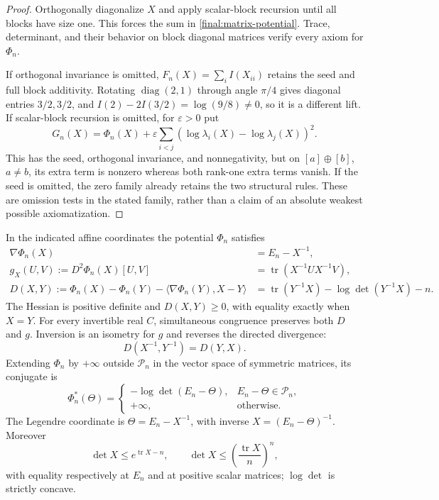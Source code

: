 \begin{proof}
Orthogonally diagonalize $X$ and apply scalar-block recursion until
all blocks have size one.  This forces the sum in
\eqref{final:matrix-potential}.  Trace, determinant, and their behavior
on block diagonal matrices verify every axiom for $\Phi_n$.

If orthogonal invariance is omitted,
$F_n(X)=\sum_i I(X_{ii})$ retains the seed and full block additivity.
Rotating $\operatorname{diag}(2,1)$ through angle $\pi/4$ gives diagonal
entries $3/2,3/2$, and
$I(2)-2I(3/2)=\log(9/8)\ne0$, so it is a different lift.
If scalar-block recursion is omitted, for $\varepsilon>0$ put
\[
 G_n(X)=\Phi_n(X)+\varepsilon
   \sum_{i<j}(\log\lambda_i(X)-\log\lambda_j(X))^2.
\]
This has the seed, orthogonal invariance, and nonnegativity, but on
$[a]\oplus[b]$, $a\ne b$, its extra term is nonzero whereas both
rank-one extra terms vanish.  If the seed is omitted, the zero family
already retains the two structural rules.  These are omission tests
in the stated family, rather than a claim of an absolute weakest
possible axiomatization.
\end{proof}

\begin{theorem}
\label{final:M2}
In the indicated affine coordinates the potential $\Phi_n$ satisfies
\begin{align}
 \nabla\Phi_n(X)&=E_n-X^{-1},\label{final:matrix-gradient}\\
 g_X(U,V):=D^2\Phi_n(X)[U,V]
   &=\operatorname{tr}(X^{-1}UX^{-1}V),\label{final:matrix-hessian}\\
 D(X,Y):=\Phi_n(X)-\Phi_n(Y)
   -\langle\nabla\Phi_n(Y),X-Y\rangle
   &=\operatorname{tr}(Y^{-1}X)-\log\det(Y^{-1}X)-n.
   \label{final:matrix-divergence}
\end{align}
The Hessian is positive definite and $D(X,Y)\geq0$, with equality
exactly when $X=Y$.  For every invertible real $C$, simultaneous
congruence preserves both $D$ and $g$.  Inversion is an isometry for
$g$ and reverses the directed divergence:
\[
 D(X^{-1},Y^{-1})=D(Y,X).
\]
Extending $\Phi_n$ by $+\infty$ outside $\mathcal P_n$ in the vector
space of symmetric matrices, its conjugate is
\begin{equation}\label{final:matrix-conjugate}
 \Phi_n^*(\Theta)=
 \begin{cases}
  -\log\det(E_n-\Theta),&E_n-\Theta\in\mathcal P_n,\\
  +\infty,&\text{otherwise}.
 \end{cases}
\end{equation}
The Legendre coordinate is $\Theta=E_n-X^{-1}$, with inverse
$X=(E_n-\Theta)^{-1}$.  Moreover
\[
 \det X\leq e^{\operatorname{tr}X-n},\qquad
 \det X\leq\left(\frac{\operatorname{tr}X}{n}\right)^n,
\]
with equality respectively at $E_n$ and at positive scalar matrices;
$\log\det$ is strictly concave.
\end{theorem}

